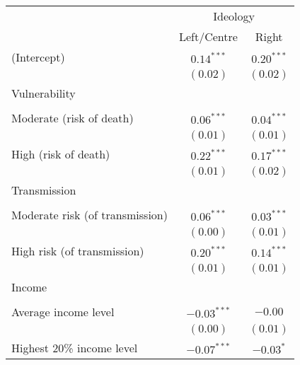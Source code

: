 
\begin{table}
\begin{center}
\begin{scriptsize}
\begin{tabular}{l c c}
\hline
 & \multicolumn{2}{c}{Ideology} \\
\cline{2-3}
 & Left/Centre & Right \\
\hline
(Intercept)                                     & $0.14^{***}$  & $0.20^{***}$ \\
                                                & $(0.02)$      & $(0.02)$     \\
Vulnerability                                   &               &              \\
                                                &               &              \\
\quad Moderate (risk of death)                  & $0.06^{***}$  & $0.04^{***}$ \\
                                                & $(0.01)$      & $(0.01)$     \\
\quad High (risk of death)                      & $0.22^{***}$  & $0.17^{***}$ \\
                                                & $(0.01)$      & $(0.02)$     \\
Transmission                                    &               &              \\
                                                &               &              \\
\quad Moderate risk (of transmission)           & $0.06^{***}$  & $0.03^{***}$ \\
                                                & $(0.00)$      & $(0.01)$     \\
\quad High risk (of transmission)               & $0.20^{***}$  & $0.14^{***}$ \\
                                                & $(0.01)$      & $(0.01)$     \\
Income                                          &               &              \\
                                                &               &              \\
\quad Average income level                      & $-0.03^{***}$ & $-0.00$      \\
                                                & $(0.00)$      & $(0.01)$     \\
\quad Highest 20\% income level                 & $-0.07^{***}$ & $-0.03^{*}$  \\

\end{tabular}
\end{scriptsize}
\end{center}
\end{table}
